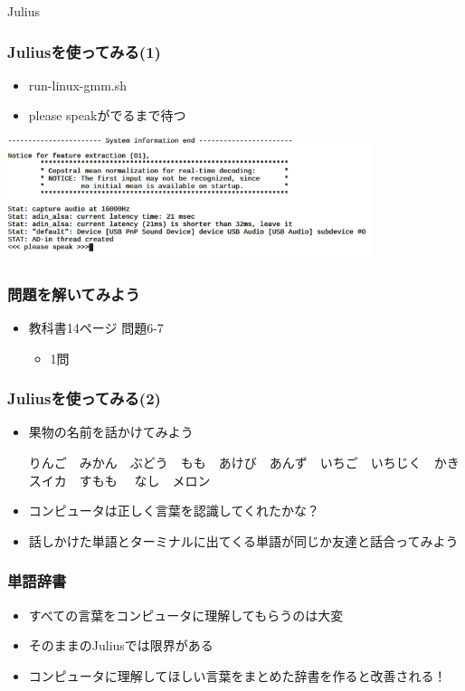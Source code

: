 \documentclass[14pt]{beamer}
\begin{document}
\begin{frame}
  \centering
  {\Large Julius}
\end{frame}

\begin{frame}
  \frametitle{Juliusを使ってみる(1)}
  \begin{itemize}
    \item run-linux-gmm.sh
    \item \<\<please speak\>\>がでるまで待つ
  \end{itemize}
  \centering
  \includegraphics[width=0.8\textwidth]{chap06/text06-img009.png}
\end{frame}

\begin{frame}
  \frametitle{問題を解いてみよう}
  \begin{itemize}
    \item 教科書14ページ 問題6-7
    \begin{itemize}
      \item 1問
    \end{itemize}
  \end{itemize}
\end{frame}

\begin{frame}
  \frametitle{Juliusを使ってみる(2)}
  \begin{itemize}
    \item 果物の名前を話かけてみよう
    \begin{center}
      {\small りんご　みかん　ぶどう　もも　あけび　あんず　いちご　いちじく　かき　スイカ　すもも　	なし　メロン}
    \end{center}
    \item コンピュータは正しく言葉を認識してくれたかな？
    \item 話しかけた単語とターミナルに出てくる単語が同じか友達と話合ってみよう
  \end{itemize}
\end{frame}

\begin{frame}
  \frametitle{単語辞書}
  \begin{itemize}
    \item すべての言葉をコンピュータに理解してもらうのは大変
    \item そのままのJuliusでは限界がある
    \item コンピュータに理解してほしい言葉をまとめた辞書を作ると改善される！
  \end{itemize}
\end{frame}
\end{document}
